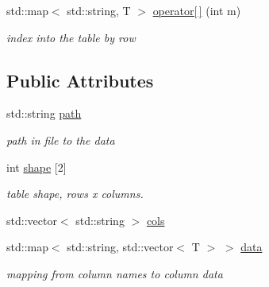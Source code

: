 \begin{DoxyCompactItemize}
\mbox{\label{classh5wrap_1_1_homogenous_type_table_a777f6bdc03111b5a7d8fde59e184e26c}} 
std\+::map$<$ std\+::string, T $>$ \hyperlink{classh5wrap_1_1_homogenous_type_table_a777f6bdc03111b5a7d8fde59e184e26c}{operator\mbox{[}$\,$\mbox{]}} (int m)
\begin{DoxyCompactList}\small\item\em index into the table by row \end{DoxyCompactList}\end{DoxyCompactItemize}
\subsection*{Public Attributes}
\begin{DoxyCompactItemize}
\item 
\mbox{\label{classh5wrap_1_1_homogenous_type_table_a6da460e4b94719f9ff5fe0d17e8859d7}} 
std\+::string \hyperlink{classh5wrap_1_1_homogenous_type_table_a6da460e4b94719f9ff5fe0d17e8859d7}{path}
\begin{DoxyCompactList}\small\item\em path in file to the data \end{DoxyCompactList}\item 
\mbox{\label{classh5wrap_1_1_homogenous_type_table_ab0e03ddbee134e775ea6fa389897fc8b}} 
int \hyperlink{classh5wrap_1_1_homogenous_type_table_ab0e03ddbee134e775ea6fa389897fc8b}{shape} \mbox{[}2\mbox{]}
\begin{DoxyCompactList}\small\item\em table shape, rows x columns. \end{DoxyCompactList}\item 
std\+::vector$<$ std\+::string $>$ \hyperlink{classh5wrap_1_1_homogenous_type_table_a8b60fa54475f44bea26caab0137d8507}{cols}
\item 
\mbox{\label{classh5wrap_1_1_homogenous_type_table_a06c1889b5469abf303923b17b78a381b}} 
std\+::map$<$ std\+::string, std\+::vector$<$ T $>$ $>$ \hyperlink{classh5wrap_1_1_homogenous_type_table_a06c1889b5469abf303923b17b78a381b}{data}
\begin{DoxyCompactList}\small\item\em mapping from column names to column data \end{DoxyCompactList}\end{DoxyCompactItemize}


